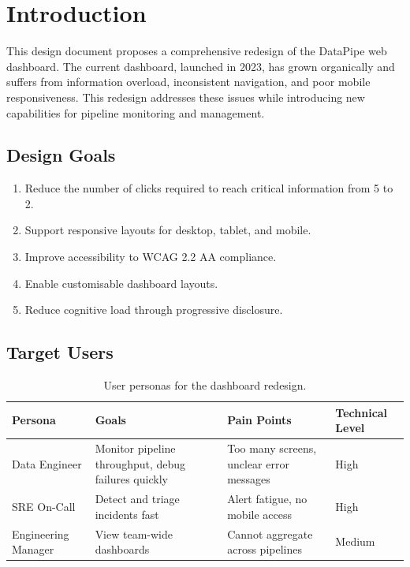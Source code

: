 \documentclass[
    language=english,
    doctype=technical-report,
    institution=none,
    titlestyle=book,
    oneside,
]{../../omnilatex}
\begin{document}
\maketitle

\tableofcontents

\chapter{Introduction}
\label{sec:introduction}

This design document proposes a comprehensive redesign of the DataPipe web
dashboard. The current dashboard, launched in 2023, has grown organically
and suffers from information overload, inconsistent navigation, and poor
mobile responsiveness. This redesign addresses these issues while
introducing new capabilities for pipeline monitoring and management.

\section{Design Goals}

\begin{enumerate}
    \item Reduce the number of clicks required to reach critical
        information from 5 to 2.
    \item Support responsive layouts for desktop, tablet, and mobile.
    \item Improve accessibility to WCAG 2.2 AA compliance.
    \item Enable customisable dashboard layouts.
    \item Reduce cognitive load through progressive disclosure.
\end{enumerate}

\section{Target Users}

\begin{table}[htbp]
    \centering
    \caption{User personas for the dashboard redesign.}
    \label{tab:personas}
    \begin{tabular}{@{}lp{3.5cm}p{3.5cm}p{3.5cm}@{}}
        \toprule
        Persona & Goals & Pain Points & Technical Level \\
        \midrule
        Data Engineer & Monitor pipeline throughput,
            debug failures quickly & Too many screens, unclear
            error messages & High \\
        SRE On-Call & Detect and triage incidents fast &
            Alert fatigue, no mobile access & High \\
        Engineering Manager & View team-wide dashboards &
            Cannot aggregate across pipelines & Medium \\
        \bottomrule
    \end{tabular}
\end{table}
\end{document}
